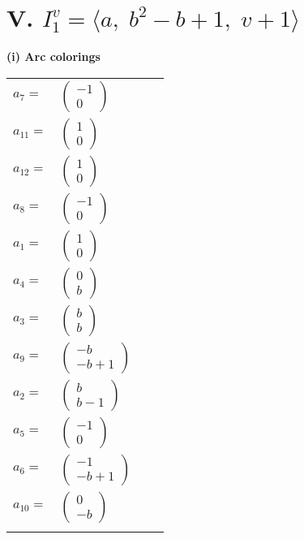 \documentclass[1p]{elsarticle_modified}
\theoremstyle{definition}
\begin{document}
\centering \section*{V. $I^v_{1}= \langle a,\;b^2- b+1,\;v+1 \rangle$}
\flushleft \textbf{(i) Arc colorings}\\
\begin{tabular}{m{7pt} m{180pt} m{7pt} m{180pt} }
\flushright $a_{7}=$&$\begin{pmatrix}-1\\0\end{pmatrix}$ \\
\flushright $a_{11}=$&$\begin{pmatrix}1\\0\end{pmatrix}$ \\
\flushright $a_{12}=$&$\begin{pmatrix}1\\0\end{pmatrix}$ \\
\flushright $a_{8}=$&$\begin{pmatrix}-1\\0\end{pmatrix}$ \\
\flushright $a_{1}=$&$\begin{pmatrix}1\\0\end{pmatrix}$ \\
\flushright $a_{4}=$&$\begin{pmatrix}0\\b\end{pmatrix}$ \\
\flushright $a_{3}=$&$\begin{pmatrix}b\\b\end{pmatrix}$ \\
\flushright $a_{9}=$&$\begin{pmatrix}- b\\- b+1\end{pmatrix}$ \\
\flushright $a_{2}=$&$\begin{pmatrix}b\\b-1\end{pmatrix}$ \\
\flushright $a_{5}=$&$\begin{pmatrix}-1\\0\end{pmatrix}$ \\
\flushright $a_{6}=$&$\begin{pmatrix}-1\\- b+1\end{pmatrix}$ \\
\flushright $a_{10}=$&$\begin{pmatrix}0\\- b\end{pmatrix}$\\&\end{tabular}
\end{document}
